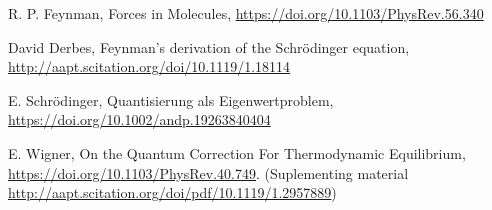\item
  R. P. Feynman,
  Forces in Molecules,
  \url{https://doi.org/10.1103/PhysRev.56.340}

\item
  David Derbes,
  Feynman’s derivation of the Schrödinger equation,
  \url{http://aapt.scitation.org/doi/10.1119/1.18114}

\item
  E. Schrödinger,
  Quantisierung als Eigenwertproblem,
  \url{https://doi.org/10.1002/andp.19263840404}

\item
  E. Wigner,
  On the Quantum Correction For Thermodynamic Equilibrium,
  \url{https://doi.org/10.1103/PhysRev.40.749}.
  (Suplementing material \url{http://aapt.scitation.org/doi/pdf/10.1119/1.2957889})

